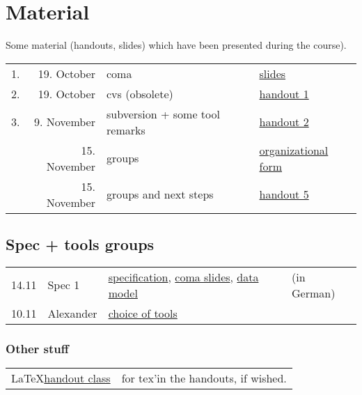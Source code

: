

\section*{Material}

Some material (handouts, slides) which have been presented during the
course).

\begin{tabular}{r@{\quad\quad}rll}
  \hline
  1. & 19. October & coma  & 
  \href{slides/main-coma.pdf}{slides}
  \\
  2. & 19. October & cvs (obsolete) & \href{handouts/handout1.pdf}{handout 1}
  \\
  3. & 9. November & subversion + some tool remarks &
  \href{handouts/handout2.pdf}{handout 2}
  \\
   & 15. November & groups &
  \href{handouts/handout4.pdf}{organizational form}
  \\
   & 15. November & groups and next steps &
  \href{handouts/handout5.pdf}{handout 5}
  \\
\end{tabular}




\subsection{Spec + tools groups}
\label{sec:material.spec-tools}


\begin{tabular}{llll}
  14.11 & Spec 1 & 
  \href{spec/material/spec1/spezifikation.pdf}{specification}, 
  \href{spec/material/spec1/slides.pdf}{coma slides}, 
  \href{spec/material/spec1/datenmodell.pdf}{data model}
  & (in German)
  \\
  10.11 & Alexander & \href{spec/material/derenbach/tools.pdf}{choice of tools}
\end{tabular}




\subsubsection*{Other stuff}

\begin{tabular}{ll}
 \LaTeX \href{misc/handout.cls}{handout class} & for tex'in the handouts, if wished.
\end{tabular}




